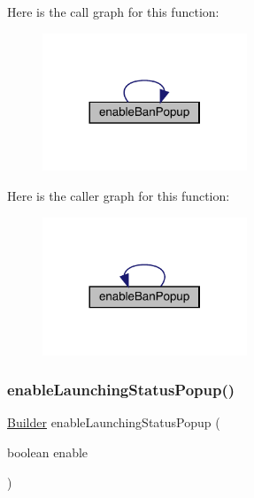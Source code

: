 Here is the call graph for this function\+:\nopagebreak
\begin{figure}[H]
\begin{center}
\leavevmode
\includegraphics[width=173pt]{classcom_1_1toast_1_1android_1_1gamebase_1_1_gamebase_configuration_1_1_builder_a92e099b86ad7acbabec3c0c4b7bda36e_cgraph}
\end{center}
\end{figure}
Here is the caller graph for this function\+:\nopagebreak
\begin{figure}[H]
\begin{center}
\leavevmode
\includegraphics[width=173pt]{classcom_1_1toast_1_1android_1_1gamebase_1_1_gamebase_configuration_1_1_builder_a92e099b86ad7acbabec3c0c4b7bda36e_icgraph}
\end{center}
\end{figure}
\mbox{\label{classcom_1_1toast_1_1android_1_1gamebase_1_1_gamebase_configuration_1_1_builder_a1012d5b14ba4676c15432cc45fd26488}} 
\subsubsection{\texorpdfstring{enable\+Launching\+Status\+Popup()}{enableLaunchingStatusPopup()}}
{\footnotesize\ttfamily \hyperlink{classcom_1_1toast_1_1android_1_1gamebase_1_1_gamebase_configuration_1_1_builder}{Builder} enable\+Launching\+Status\+Popup (\begin{DoxyParamCaption}\item[{boolean}]{enable }\end{DoxyParamCaption})}

